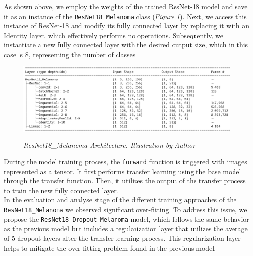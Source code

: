 As shown above, we employ the weights of the trained ResNet-18 model and save
it as an instance of the \texttt{ResNet18\_Melanoma} class (\textit{Figure
\ref{fig:resnet-18-melanoma-arch}}). Next, we access this instance of ResNet-18
and modify its fully connected layer by replacing it with an Identity layer,
which effectively performs no operations. Subsequently, we instantiate a new
fully connected layer with the desired output size, which in this case is 8,
representing the number of classes.

\begin{figure}[H]
  \centering
  \includegraphics[width=\textwidth]{imatges/methodological_contribution/ResNet18_Melanoma.png}
  \caption[ResNet18\_Melanoma Architecture]{\textit{ResNet18\_Melanoma Architecture. Illustration by Author}}
  {\label{fig:resnet-18-melanoma-arch}}
\end{figure}

During the model training process, the {\tt forward} function is triggered with
images represented as a tensor. It first performs transfer learning using the
base model through the transfer function. Then, it utilizes the output of the
transfer process to train the new fully connected layer. \\

In the evaluation and analyse stage of the different training approaches of the
{\tt ResNet18\_Melanoma} we observed significant over-fitting. To address this
issue, we propose the {\tt ResNet18\_Dropout\_Melanoma} model, which follows
the same behavior as the previous model but includes a regularization layer
that utilizes the average of 5 dropout layers after the transfer learning
process. This regularization layer helps to mitigate the over-fitting problem
found in the previous model.

